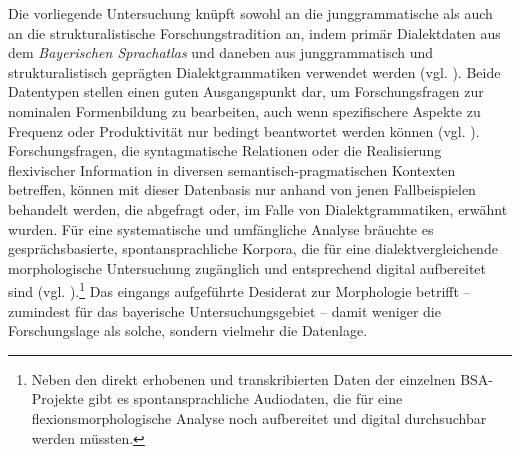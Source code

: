\begin{sloppypar}
Die vorliegende Untersuchung knüpft sowohl an die junggrammatische als auch an die strukturalistische Forschungstradition an, indem primär Dialektdaten aus dem \textit{Bayerischen Sprachatlas} und daneben aus junggrammatisch und strukturalistisch geprägten Dialektgrammatiken verwendet werden (vgl. ). Beide Datentypen stellen einen guten Ausgangspunkt dar, um Forschungsfragen zur nominalen Formenbildung zu bearbeiten, auch wenn spezifischere Aspekte zu Frequenz oder Produktivität nur bedingt beantwortet werden können (vgl. \citealt[391--392]{NickelKürschner2019}). Forschungsfragen, die syntagmatische Relationen oder die Realisierung flexivischer Information in diversen semantisch-pragmatischen Kontexten betreffen, können mit dieser Datenbasis nur anhand von jenen Fallbeispielen behandelt werden, die abgefragt oder, im Falle von Dialektgrammatiken, erwähnt wurden. Für eine systematische und umfängliche Analyse bräuchte es gesprächsbasierte, spontansprachliche Korpora, die für eine dialektvergleichende morphologische Untersuchung zugänglich und entsprechend digital aufbereitet sind (vgl. \citealt[39]{SchmidtEtAl2019}).\footnote{Neben den direkt erhobenen und transkribierten Daten der einzelnen BSA-Projekte gibt es spontansprachliche Audiodaten, die für eine flexionsmorphologische Analyse noch aufbereitet und digital durchsuchbar werden müssten.} Das eingangs aufgeführte Desiderat zur Morphologie betrifft -- zumindest für das bayerische Untersuchungsgebiet -- damit weniger die Forschungslage als solche, sondern vielmehr die Datenlage.
\end{sloppypar}
